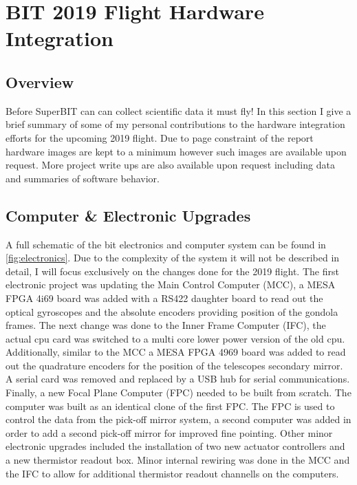 \chapter{BIT 2019 Flight Hardware Integration}
\section{Overview}
Before SuperBIT can can collect scientific data it must fly! In this section I give a brief summary of some of my personal contributions to the hardware integration efforts for the upcoming 2019 flight. Due to page constraint of the report hardware images are kept to a minimum however such images are available upon request. More project write ups are also available upon request including data and summaries of software behavior. 

\section{Computer \& Electronic Upgrades}
A full schematic of the bit electronics and computer system can be found in \autoref{fig:electronics}. Due to the complexity of the system it will not be described in detail, I will focus exclusively on the changes done for the 2019 flight. The first electronic project was updating the Main Control Computer (MCC), a MESA FPGA 4i69 board was added with a RS422 daughter board to read out the optical gyroscopes and the absolute encoders providing position of the gondola frames. The next change was done to the Inner Frame Computer (IFC), the actual cpu card was switched to a multi core lower power version of the old cpu. Additionally, similar to the MCC a MESA FPGA 4969 board was added to read out the quadrature encoders for the position of the telescopes secondary mirror. A serial card was removed and replaced by a USB hub for serial communications. Finally, a new Focal Plane Computer (FPC) needed to be built from scratch. The computer was built as an identical clone of the first FPC. The FPC is used to control the data from the pick-off mirror system, a second computer was added in order to add a second pick-off mirror for improved fine pointing. Other minor electronic upgrades included the installation of two new actuator controllers and a new thermistor readout box. Minor internal rewiring was done in the MCC and the IFC to allow for additional thermistor readout channells on the computers.

